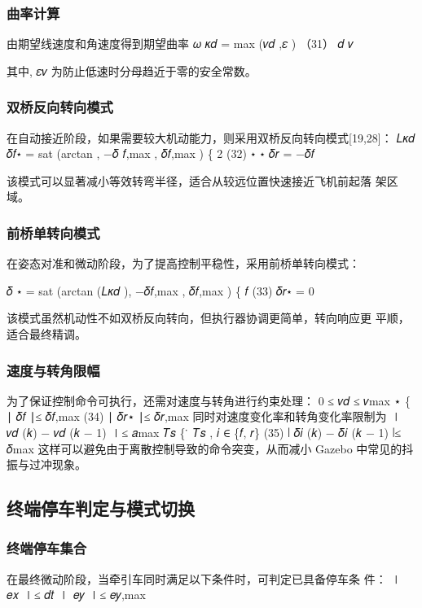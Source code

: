 \subsubsection{曲率计算}
由期望线速度和角速度得到期望曲率
𝜔
𝜅𝑑 = max (𝑣𝑑 ,𝜀 )                  （31）
𝑑 𝑣


其中, 𝜀𝑣 为防止低速时分母趋近于零的安全常数。


\subsubsection{双桥反向转向模式}
在自动接近阶段，如果需要较大机动能力，则采用双桥反向转向模式[19,28]：
𝐿𝜅𝑑
𝛿𝑓⋆ = sat (arctan         , −𝛿
𝑓,max     , 𝛿𝑓,max )
\{                     2                            (32)
⋆     ⋆
𝛿𝑟 = −𝛿𝑓

该模式可以显著减小等效转弯半径，适合从较远位置快速接近飞机前起落
架区域。
\subsubsection{前桥单转向模式}
在姿态对准和微动阶段，为了提高控制平稳性，采用前桥单转向模式：

𝛿 ⋆ = sat (arctan (𝐿𝜅𝑑 ), −𝛿𝑓,max , 𝛿𝑓,max )
\{ 𝑓                                                (33)
𝛿𝑟⋆ = 0








该模式虽然机动性不如双桥反向转向，但执行器协调更简单，转向响应更
平顺，适合最终精调。
\subsubsection{速度与转角限幅}
为了保证控制命令可执行，还需对速度与转角进行约束处理：
0 ≤ 𝑣𝑑 ≤ 𝑣max
⋆
\{ ∣ 𝛿𝑓 ∣≤ 𝛿𝑓,max                                               (34)
∣ 𝛿𝑟⋆ ∣≤ 𝛿𝑟,max
同时对速度变化率和转角变化率限制为
∣ 𝑣𝑑 (𝑘) − 𝑣𝑑 (𝑘 − 1) ∣≤ 𝑎max 𝑇𝑠
\{                            ̇ 𝑇𝑠 , 𝑖 ∈ \{𝑓, 𝑟\}                      (35)
∣ 𝛿𝑖 (𝑘) − 𝛿𝑖 (𝑘 − 1) ∣≤ 𝛿max
这样可以避免由于离散控制导致的命令突变，从而减小 Gazebo 中常见的抖
振与过冲现象。
\subsection{终端停车判定与模式切换}
\subsubsection{终端停车集合}
在最终微动阶段，当牵引车同时满足以下条件时，可判定已具备停车条
件：
∣ 𝑒𝑥 ∣≤ 𝑑𝑡
∣ 𝑒𝑦 ∣≤ 𝑒𝑦,max
